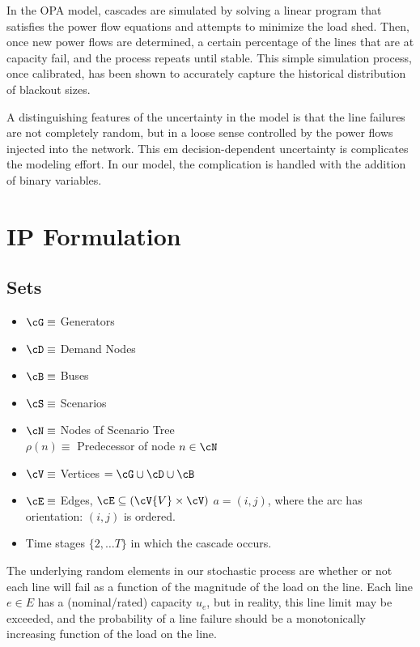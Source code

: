 In the OPA model, cascades are simulated by
solving a linear program that satisfies the power flow equations and
attempts to minimize the load shed.  Then, once new power flows are
determined, a certain percentage of the lines that are at capacity
fail, and the process repeats until stable.  This simple simulation
process, once calibrated, has been shown to accurately capture the
historical distribution of blackout sizes.

A distinguishing features of the uncertainty in the model is that the
line failures are not completely random, but in a loose sense controlled
by the power flows injected into the network.  This em
  decision-dependent uncertainty is complicates the modeling effort.
In our model, the complication is handled with the addition of binary
variables.




\section{IP Formulation}

\subsection{Sets}

\begin{itemize}
\item $ \cG \equiv $ Generators 
\item $ \cD \equiv $ Demand Nodes 
\item $ \cB \equiv $ Buses 
\item $ \cS \equiv $ Scenarios 
\item $ \cN \equiv $ Nodes of Scenario Tree\\
	$\rho \left( n \right) \equiv $ Predecessor of node $ n \in \cN $
\item $ \cV \equiv $ Vertices $ = \cG \cup \cD \cup \cB $
\item $ \cE \equiv $ Edges, $ \cE \subseteq (\cV{V} \times \cV )$\newline
	$  a = ( i , j )  $,  where the arc has orientation: $(i,j)$ is ordered. 
\item Time stages $\{2,\ldots T\}$ in which the cascade occurs.
\end{itemize}





The underlying random elements in our stochastic process are whether
or not each line will fail as a function of the magnitude of the load
on the line.  Each line $e \in E$ has a (nominal/rated) capacity
$u_e$, but in reality, this line limit may be exceeded, and the
probability of a line failure should be a monotonically increasing
function of the load on the line.

